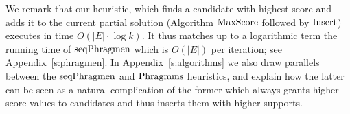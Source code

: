 We remark that our heuristic, which finds a candidate with highest score and adds it to the current partial solution (Algorithm $\operatorname{MaxScore}$ followed by $\operatorname{Insert}$) executes in time $O(|E|\cdot \log k)$. 
It thus matches up to a logarithmic term the running time of $\operatorname{seqPhragmen}$ which is $O(|E|)$ per iteration; see Appendix~\ref{s:phragmen}. 
In Appendix~\ref{s:algorithms} we also draw parallels between the $\operatorname{seqPhragmen}$ and $\operatorname{Phragmms}$ heuristics, and explain how the latter can be seen as a natural complication of the former which always grants higher score values to candidates and thus inserts them with higher supports.

